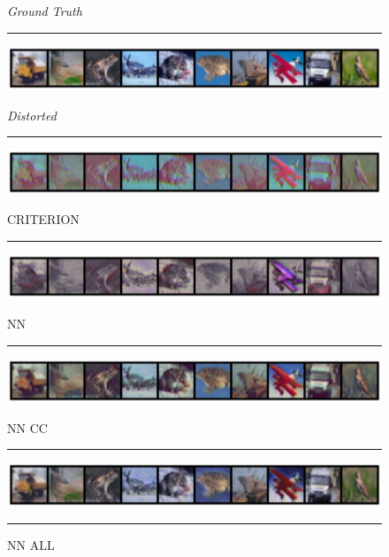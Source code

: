 \begin{figure}[h]
    \centering
    \setlength{\abovecaptionskip}{0pt plus 0pt minus 0pt}
    \setlength{\belowcaptionskip}{10pt plus 0pt minus 0pt}
    \caption*{\normalsize{\textit{Ground Truth}}}
    \rule{0.4\textwidth}{.4pt}
    
    \centerline{\hspace*{8mm}\includegraphics[width=1.4\textwidth]{figures/reconstruction_CIFAR10_ground_truth.png}}
    \caption*{\normalsize{\textit{Distorted}}}
    \rule{0.4\textwidth}{.4pt}
    
    \centerline{\hspace*{8mm}\includegraphics[width=1.4\textwidth]{figures/reconstruction_CIFAR10_distorted.png}}
    \caption*{\normalsize{CRITERION}}
    \rule{0.4\textwidth}{.4pt}
    
    \centerline{\hspace*{8mm}\includegraphics[width=1.4\textwidth]{figures/reconstruction_CIFAR10_CRITERION_epoch_100.png}}
    \caption*{\normalsize{NN}}
    \rule{0.4\textwidth}{.4pt}
    
    \centerline{\hspace*{8mm}\includegraphics[width=1.4\textwidth]{figures/reconstruction_CIFAR10_NN_epoch_100.png}}
    \caption*{\normalsize{NN CC}}
    \rule{0.4\textwidth}{.4pt}
    
    \centerline{\hspace*{8mm}\includegraphics[width=1.4\textwidth]{figures/reconstruction_CIFAR10_NN_CC_epoch_100.png}}
    \caption*{\normalsize{NN ALL}}
    \rule{0.4\textwidth}{.4pt}
    

\end{figure}
